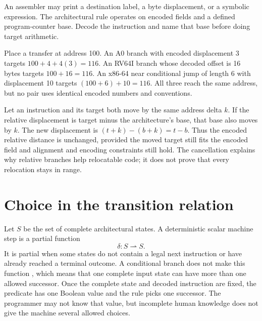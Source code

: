 \begin{warning}[title={Never infer the target base from the printed operand}]
An assembler may print a destination label, a byte displacement, or a
symbolic expression. The architectural rule operates on encoded fields and a
defined program-counter base. Decode the instruction and name that base before
doing target arithmetic.
\end{warning}

\begin{example}[title={The same address, three calculations}]
Place a transfer at address 100. An A0 branch with encoded displacement 3
targets \(100+4+4(3)=116\). An RV64I branch whose decoded offset is 16 bytes
targets \(100+16=116\). An x86-64 near conditional jump of length 6 with
displacement 10 targets \((100+6)+10=116\). All three reach the same address,
but no pair uses identical encoded numbers and conventions.
\end{example}

\begin{proofkit}[title={A target calculation that survives relocation}]
Let an instruction and its target both move by the same address delta \(k\).
If the relative displacement is target minus the architecture's base, that
base also moves by \(k\). The new displacement is
\((t+k)-(b+k)=t-b\). Thus the encoded relative distance is unchanged, provided
the moved target still fits the encoded field and alignment and encoding constraints
still hold. The cancellation explains why relative branches help relocatable
code; it does not prove that every relocation stays in range.
\end{proofkit}

\section{Choice in the transition relation}

Let \(S\) be the set of complete architectural states. A deterministic scalar
machine step is a partial function
\[
  \delta:S\rightharpoonup S.
\]
It is partial when some states do not contain a legal next instruction or have
already reached a terminal outcome. A conditional branch does not make this
function , which means that one complete input state
can have more than one allowed successor. Once the complete state and decoded
instruction are fixed, the predicate has one Boolean value and the rule picks
one successor. The programmer may not know that value, but incomplete human
knowledge does not give the machine several allowed choices.


